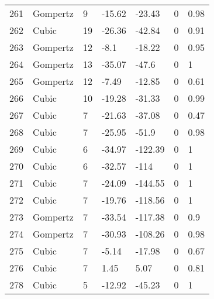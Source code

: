 \documentclass[11pt]{article}
\begin{document}
\begin{center}
\begin{longtable}{lllllll}
        261 & Gompertz  & 9               & -15.62  & -23.43  & 0       & 0.98 \\
        262 & Cubic     & 19              & -26.36  & -42.84  & 0       & 0.91 \\
        263 & Gompertz  & 12              & -8.1    & -18.22  & 0       & 0.95 \\
        264 & Gompertz  & 13              & -35.07  & -47.6   & 0       & 1    \\
        265 & Gompertz  & 12              & -7.49   & -12.85  & 0       & 0.61 \\
        266 & Cubic     & 10              & -19.28  & -31.33  & 0       & 0.99 \\
        267 & Cubic     & 7               & -21.63  & -37.08  & 0       & 0.47 \\
        268 & Cubic     & 7               & -25.95  & -51.9   & 0       & 0.98 \\
        269 & Cubic     & 6               & -34.97  & -122.39 & 0       & 1    \\
        270 & Cubic     & 6               & -32.57  & -114    & 0       & 1    \\
        271 & Cubic     & 7               & -24.09  & -144.55 & 0       & 1    \\
        272 & Cubic     & 7               & -19.76  & -118.56 & 0       & 1    \\
        273 & Gompertz  & 7               & -33.54  & -117.38 & 0       & 0.9  \\
        274 & Gompertz  & 7               & -30.93  & -108.26 & 0       & 0.98 \\
        275 & Cubic     & 7               & -5.14   & -17.98  & 0       & 0.67 \\
        276 & Cubic     & 7               & 1.45    & 5.07    & 0       & 0.81 \\
        278 & Cubic     & 5               & -12.92  & -45.23  & 0       & 1   
    \end{longtable}
    \end{center}
    \pagebreak
\end{document}
